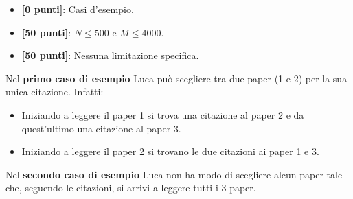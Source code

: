 \begin{itemize}[nolistsep,itemsep=2mm]
  \item \textbf{ [\phantom{0}0 punti]}: Casi d'esempio.
  \item \textbf{ [50 punti]}: $N \le 500$ e $M \le 4000$.
  \item \textbf{ [50 punti]}: Nessuna limitazione specifica.
\end{itemize}



\Examples

\begin{example}
%
%
\end{example}


\Explanation

Nel \textbf{primo caso di esempio} Luca può scegliere tra due paper (1 e 2) per la sua unica citazione. Infatti:
\begin{itemize}
    \item Iniziando a leggere il paper 1 si trova una citazione al paper 2 e da quest'ultimo una citazione al paper 3.
    \item Iniziando a leggere il paper 2 si trovano le due citazioni ai paper 1 e 3.
\end{itemize}

Nel \textbf{secondo caso di esempio} Luca non ha modo di scegliere alcun paper tale che, seguendo le citazioni, si arrivi a leggere tutti i 3 paper.

